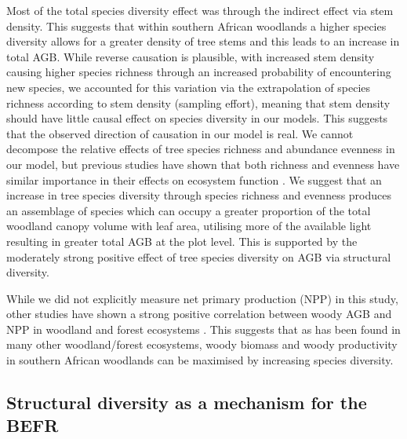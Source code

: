 \documentclass[11pt,a4paper]{article}
\begin{document}
Most of the total species diversity effect was through the indirect effect via stem density. This suggests that within southern African woodlands a higher species diversity allows for a greater density of tree stems and this leads to an increase in total AGB. While reverse causation is plausible, with increased stem density causing higher species richness through an increased probability of encountering new species, we accounted for this variation via the extrapolation of species richness according to stem density (sampling effort), meaning that stem density should have little causal effect on species diversity in our models. This suggests that the observed direction of causation in our model is real. We cannot decompose the relative effects of tree species richness and abundance evenness in our model, but previous studies have shown that both richness and evenness have similar importance in their effects on ecosystem function \citep{Valery2009, Zhang2012}. We suggest that an increase in tree species diversity through species richness and evenness produces an assemblage of species which can occupy a greater proportion of the total woodland canopy volume with leaf area, utilising more of the available light resulting in greater total AGB at the plot level. This is supported by the moderately strong positive effect of tree species diversity on AGB via structural diversity.


While we did not explicitly measure net primary production (NPP) in this study, other studies have shown a strong positive correlation between woody AGB and NPP in woodland and forest ecosystems \citep{Chisholm2013, Prado-Junior2016}. This suggests that as has been found in many other woodland/forest ecosystems, woody biomass and woody productivity in southern African woodlands can be maximised by increasing species diversity. 

\subsection{Structural diversity as a mechanism for the BEFR}
\end{document}
